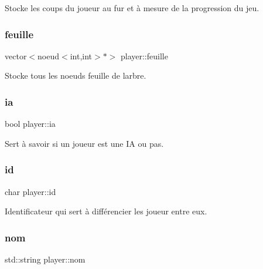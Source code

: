 Stocke les coups du joueur au fur et à mesure de la progression du jeu. 

\mbox{\label{classplayer_aa16931420b88ef2fc8ebe28a6bd26b1b}} 
\subsubsection{\texorpdfstring{feuille}{feuille}}
{\footnotesize\ttfamily vector$<$noeud$<$int,int$>$$\ast$$>$ player\+::feuille\hspace{0.3cm}{\ttfamily [private]}}



Stocke tous les noeuds feuille de l\textquotesingle{}arbre. 

\mbox{\label{classplayer_ab5c7590da844e3e2128868820ab9ec45}} 
\subsubsection{\texorpdfstring{ia}{ia}}
{\footnotesize\ttfamily bool player\+::ia\hspace{0.3cm}{\ttfamily [private]}}



Sert à savoir si un joueur est une IA ou pas. 

\mbox{\label{classplayer_a5862f005a5367e1b0dc19bdf2846fd34}} 
\subsubsection{\texorpdfstring{id}{id}}
{\footnotesize\ttfamily char player\+::id\hspace{0.3cm}{\ttfamily [private]}}



Identificateur qui sert à différencier les joueur entre eux. 

\mbox{\label{classplayer_ae6c0f854d63dc4b938b52f10b4334dbc}} 
\subsubsection{\texorpdfstring{nom}{nom}}
{\footnotesize\ttfamily std\+::string player\+::nom\hspace{0.3cm}{\ttfamily [private]}}



